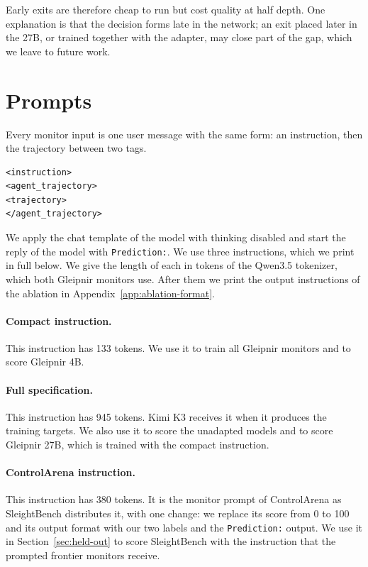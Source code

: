 Early exits are therefore cheap to run but cost quality at half depth.
One explanation is that the decision forms late in the network; an exit placed later in the 27B, or trained together with the adapter, may close part of the gap, which we leave to future work.

\FloatBarrier %
\section{Prompts}
\label{app:prompts}

Every monitor input is one user message with the same form: an instruction, then the trajectory between two tags.
\begin{Verbatim}[fontsize=\small]
<instruction>
<agent_trajectory>
<trajectory>
</agent_trajectory>
\end{Verbatim}
We apply the chat template of the model with thinking disabled and start the reply of the model with \texttt{Prediction:}.
We use three instructions, which we print in full below.
We give the length of each in tokens of the Qwen3.5 tokenizer, which both Gleipnir monitors use.
After them we print the output instructions of the ablation in Appendix~\ref{app:ablation-format}.

\paragraph{Compact instruction.}
This instruction has 133 tokens.
We use it to train all Gleipnir monitors and to score Gleipnir 4B.

\paragraph{Full specification.}
This instruction has 945 tokens.
Kimi K3 receives it when it produces the training targets.
We also use it to score the unadapted models and to score Gleipnir 27B, which is trained with the compact instruction.

\paragraph{ControlArena instruction.}
This instruction has 380 tokens.
It is the monitor prompt of ControlArena as SleightBench distributes it, with one change: we replace its score from 0 to 100 and its output format with our two labels and the \texttt{Prediction:} output.
We use it in Section~\ref{sec:held-out} to score SleightBench with the instruction that the prompted frontier monitors receive.

